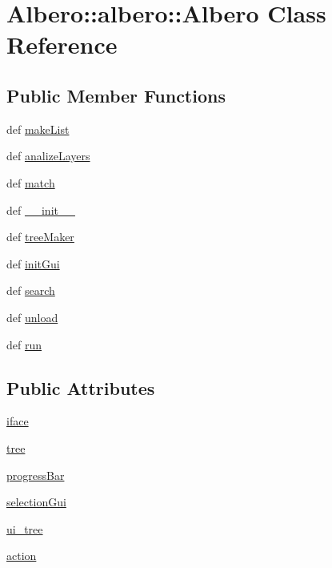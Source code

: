 \hypertarget{classAlbero_1_1albero_1_1Albero}{
\section{Albero::albero::Albero Class Reference}
\label{classAlbero_1_1albero_1_1Albero}
}
\subsection*{Public Member Functions}
\begin{DoxyCompactItemize}
\item 
def \hyperlink{classAlbero_1_1albero_1_1Albero_a661fd42b663f1a288ee2d95359997f74}{makeList}
\item 
def \hyperlink{classAlbero_1_1albero_1_1Albero_ac4adc452504cba2cd63a9624b42c243a}{analizeLayers}
\item 
def \hyperlink{classAlbero_1_1albero_1_1Albero_aac0ac8d422c7833ccda67b441c6dd794}{match}
\item 
def \hyperlink{classAlbero_1_1albero_1_1Albero_a1b52e68406edabff38d27c9422fd86fe}{\_\-\_\-init\_\-\_\-}
\item 
def \hyperlink{classAlbero_1_1albero_1_1Albero_a6a495abfecbe374852db2023b285d9fc}{treeMaker}
\item 
def \hyperlink{classAlbero_1_1albero_1_1Albero_a6007a19f6c4d073c5e716d45f1db22f4}{initGui}
\item 
def \hyperlink{classAlbero_1_1albero_1_1Albero_a10cbbc133847067c3115ff41cbe54fd7}{search}
\item 
def \hyperlink{classAlbero_1_1albero_1_1Albero_a1ba563b0a818f61bc9b5a8efaa99ac5c}{unload}
\item 
def \hyperlink{classAlbero_1_1albero_1_1Albero_a59394777aa0500d44f5008c716bf2115}{run}
\end{DoxyCompactItemize}
\subsection*{Public Attributes}
\begin{DoxyCompactItemize}
\item 
\hyperlink{classAlbero_1_1albero_1_1Albero_a510b8efe72f492fd700a6063774817b4}{iface}
\item 
\hyperlink{classAlbero_1_1albero_1_1Albero_a1173a8928630330beac5f6dbd915f1b7}{tree}
\item 
\hyperlink{classAlbero_1_1albero_1_1Albero_ab77e237d2171e764df99053f874266c4}{progressBar}
\item 
\hyperlink{classAlbero_1_1albero_1_1Albero_a438b3dfb9456d9cca66c5565475791a6}{selectionGui}
\item 
\hyperlink{classAlbero_1_1albero_1_1Albero_a7779297cd2492323d40d7c977daee702}{ui\_\-tree}
\item 
\hyperlink{classAlbero_1_1albero_1_1Albero_a5f0365f3fddeb9e91f8fe368565400aa}{action}
\end{DoxyCompactItemize}


